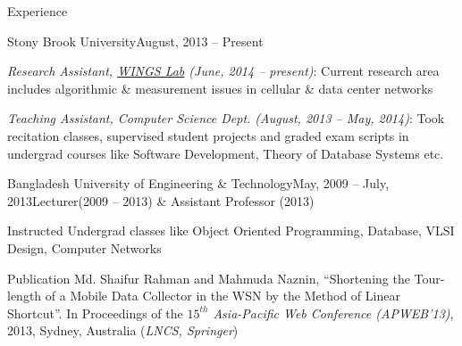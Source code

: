 \documentclass{resume} %
\begin{document}
\begin{rSection}{Experience}
\begin{rSubsection}{Stony Brook University}{August, 2013 -- 
Present}{}{}
\item \textit{Research Assistant,
\href{http://www.wings.cs.stonybrook.edu/}{WINGS Lab} (June, 2014 -- present)}:
Current research area includes algorithmic \& measurement issues in cellular \&
data center networks
\item \textit{Teaching Assistant, Computer Science Dept. (August, 2013 -- May,
2014)}:
Took recitation classes, supervised student projects and graded exam scripts in undergrad courses like Software Development, Theory of Database
Systems etc.
\end{rSubsection} 
\begin{rSubsection}{Bangladesh University of Engineering \&
Technology}{May, 2009 -- July, 2013}{Lecturer(2009 -- 2013) \& Assistant
Professor (2013)}{}
\item Instructed Undergrad classes like Object Oriented Programming, Database,
 VLSI Design, Computer Networks 
\end{rSubsection}
\end{rSection}
\begin{rSection}{Publication}
 Md. Shaifur Rahman and Mahmuda Naznin, ``Shortening the Tour-length of a Mobile Data Collector
  in the WSN by the Method of Linear Shortcut''. In Proceedings of the
  \textit{$15^{th}$ Asia-Pacific Web Conference (APWEB'13)}, 2013, Sydney,
  Australia (\textit{LNCS, Springer})
\end{rSection}
\end{document}
